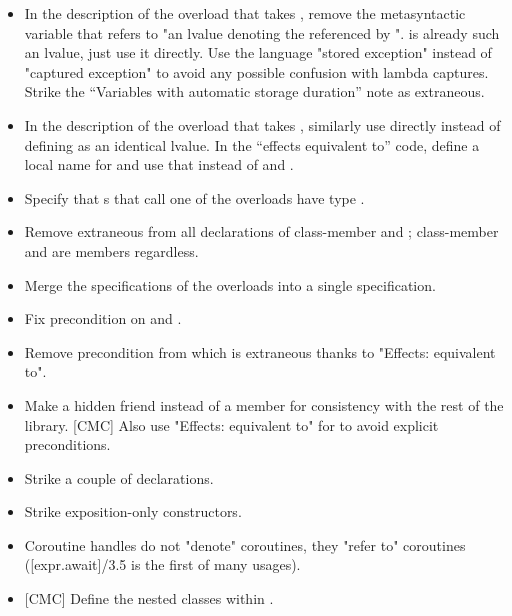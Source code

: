 \documentclass{wg21}
\begin{document}
\begin{itemize}
\item In the description of the 
  overload that takes ,
  remove the metasyntactic variable 
  that refers to "an lvalue denoting the 
  referenced by ".
   is already such an lvalue, just use it directly.
  Use the language "stored exception" instead of "captured exception"
  to avoid any possible confusion with lambda captures.
  Strike the ``Variables with automatic storage duration'' note
  as extraneous.
\item In the description of the 
  overload that takes ,
  similarly use  directly
  instead of defining  as an identical lvalue.
  In the ``effects equivalent to'' code,
  define a local name for 
  and use that instead of  and .
\item Specify that s that call
  one of the  overloads
  have type .
\item Remove extraneous  from all declarations
  of class-member  and ;
  class-member  and 
  are  members regardless.
\item Merge the specifications of the  overloads
  into a single specification.
\item Fix precondition on  and
  .
\item Remove precondition from 
  which is extraneous thanks to "Effects: equivalent to".
\item Make  a hidden friend instead of a member
  for consistency with the rest of the library.
  [CMC] Also use "Effects: equivalent to" for 
  to avoid explicit preconditions.
\item Strike a couple of  declarations.
\item Strike exposition-only constructors.
\item Coroutine handles do not "denote" coroutines,
  they "refer to" coroutines ([expr.await]/3.5 is the first of many usages).
\item{} [CMC] Define the nested classes within .
\end{itemize}
\end{document}
